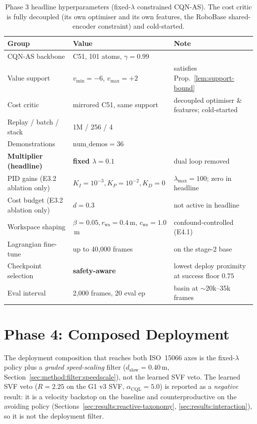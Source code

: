 \documentclass[11pt,a4paper]{report}
\newcommand{\iso}{ISO~15066}
\newcommand{\cqnas}{CQN-AS}
\begin{document}
\begin{table}[h]
\centering
\small
\caption{Phase 3 headline hyperparameters (fixed-$\lambda$
constrained \cqnas{}). The cost critic is fully decoupled (its own
optimiser and its own features, the RoboBase shared-encoder
constraint) and cold-started.}
\label{tab:app-hparams-lagrangian}
\begin{tabular}{lll}
\toprule
Group & Value & Note \\
\midrule
\cqnas{} backbone & C51, 101 atoms, $\gamma = 0.99$ & \cite{seo2024cqnas} \\
Value support & $v_{\min} = -6$, $v_{\max} = +2$ & satisfies Prop.~\ref{lem:support-bound} \\
Cost critic & mirrored C51, same support & decoupled optimiser \& features; cold-started \\
Replay / batch / stack & 1M / 256 / 4 & \\
Demonstrations & $\text{num\_demos} = 36$ & \\
\textbf{Multiplier (headline)} & \textbf{fixed $\lambda = 0.1$} & dual loop removed \\
PID gains (E3.2 ablation only) & $K_I{=}10^{-3}, K_P{=}10^{-2}, K_D{=}0$ & $\lambda_{\max}{=}100$; zero in headline \\
Cost budget (E3.2 ablation only) & $d = 0.3$ & not active in headline \\
Workspace shaping & $\beta{=}0.05, r_{\mathrm{ws}}{=}0.4$\,m, $c_{\mathrm{ws}}{=}1.0$\,m & confound-controlled (E4.1) \\
Lagrangian fine-tune & up to 40{,}000 frames & on the stage-2 base \\
Checkpoint selection & \textbf{safety-aware} & lowest deploy proximity at success floor $0.75$ \\
Eval interval & 2{,}000 frames, 20 eval ep & basin at $\sim$20k--35k frames \\
\bottomrule
\end{tabular}
\end{table}

\section{Phase 4: Composed Deployment}
\label{app:hparams:hybrid}

The deployment composition that reaches both \iso{} axes is the
fixed-$\lambda$ policy plus a \emph{graded speed-scaling} filter
($d_{\mathrm{slow}} = 0.40$\,m,
Section~\ref{sec:method:filter:speedscale}), not the learned SVF
veto. The learned
SVF veto ($R = 2.25$ on the G1 v3 SVF, $\alpha_{\mathrm{CQL}} = 5.0$)
is reported as a \emph{negative} result: it is a velocity backstop on
the baseline and counterproductive on the avoiding policy
(Sections~\ref{sec:results:reactive-taxonomy},
\ref{sec:results:interaction}), so it is not the deployment filter.
\end{document}

